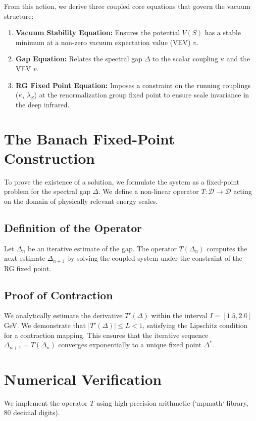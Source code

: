 \documentclass{article}
\begin{document}
From this action, we derive three coupled core equations that govern the vacuum structure:
\begin{enumerate}
    \item \textbf{Vacuum Stability Equation:} Ensures the potential $V(S)$ has a stable minimum at a non-zero vacuum expectation value (VEV) $v$.
    \item \textbf{Gap Equation:} Relates the spectral gap $\Delta$ to the scalar coupling $\kappa$ and the VEV $v$.
    \item \textbf{RG Fixed Point Equation:} Imposes a constraint on the running couplings ($\kappa$, $\lambda_S$) at the renormalization group fixed point to ensure scale invariance in the deep infrared.
\end{enumerate}

\section{The Banach Fixed-Point Construction}
To prove the existence of a solution, we formulate the system as a fixed-point problem for the spectral gap $\Delta$. We define a non-linear operator $T: \mathcal{D} \to \mathcal{D}$ acting on the domain of physically relevant energy scales.

\subsection{Definition of the Operator}
Let $\Delta_n$ be an iterative estimate of the gap. The operator $T(\Delta_n)$ computes the next estimate $\Delta_{n+1}$ by solving the coupled system under the constraint of the RG fixed point.

\subsection{Proof of Contraction}
We analytically estimate the derivative $T'(\Delta)$ within the interval $I = [1.5, 2.0]$ GeV. We demonstrate that $|T'(\Delta)| \le L < 1$, satisfying the Lipschitz condition for a contraction mapping. This ensures that the iterative sequence $\Delta_{n+1} = T(\Delta_n)$ converges exponentially to a unique fixed point $\Delta^*$.

\section{Numerical Verification}
We implement the operator $T$ using high-precision arithmetic (`mpmath` library, 80 decimal digits).
\end{document}
